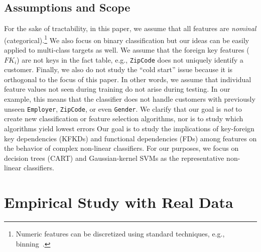 \documentclass[sigconf]{acmart}
\begin{document}
\subsection{Assumptions and Scope}
For the sake of tractability, in this paper, we assume that all features are \textit{nominal} (categorical).\footnote{Numeric features can be discretized 
using standard techniques, e.g., binning~\cite{mitchellbook}.} We also focus on binary classification but our ideas can be easily applied to multi-class targets as well.
We assume that the foreign key features ($FK_i$) are not keys in the fact table, e.g., \texttt{ZipCode} does not uniquely identify a customer.
Finally, we also do not study the ``cold start'' issue because it is orthogonal to the focus of this paper. 
In other words, we assume that individual feature values not seen during training do not arise during testing. 
In our example, this means that the classifier does not handle customers with previously unseen \texttt{Employer}, \texttt{ZipCode}, or even \texttt{Gender}. 
We clarify that our goal is \textit{not} to create new classification or feature selection algorithms, nor is to study which algorithms yield lowest errors
Our goal is to study the implications of key-foreign key dependencies (KFKDs) and functional dependencies (FDs) among features on the behavior of complex non-linear classifiers.
For our purposes, we focus on decision trees (CART) and Gaussian-kernel SVMs as the representative non-linear classifiers.



\section{Empirical Study with Real Data}
\end{document}
